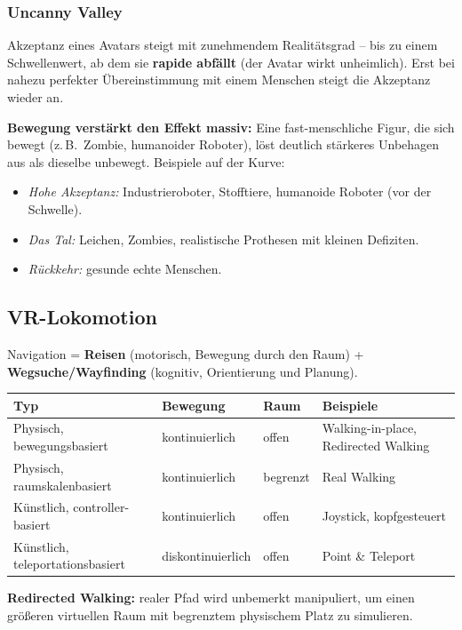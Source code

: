 \documentclass[12pt, a4paper]{article}
\begin{document}
\subsubsection*{Uncanny Valley}

Akzeptanz eines Avatars steigt mit zunehmendem Realitätsgrad -- bis zu einem Schwellenwert, ab dem sie \textbf{rapide abfällt} (der Avatar wirkt unheimlich). Erst bei nahezu perfekter Übereinstimmung mit einem Menschen steigt die Akzeptanz wieder an.

\textbf{Bewegung verstärkt den Effekt massiv:} Eine fast-menschliche Figur, die sich bewegt (z.\,B.\ Zombie, humanoider Roboter), löst deutlich stärkeres Unbehagen aus als dieselbe unbewegt. Beispiele auf der Kurve:
\begin{itemize}
  \item \textit{Hohe Akzeptanz:} Industrieroboter, Stofftiere, humanoide Roboter (vor der Schwelle).
  \item \textit{Das Tal:} Leichen, Zombies, realistische Prothesen mit kleinen Defiziten.
  \item \textit{Rückkehr:} gesunde echte Menschen.
\end{itemize}

\subsection{VR-Lokomotion}

Navigation = \textbf{Reisen} (motorisch, Bewegung durch den Raum) + \textbf{Wegsuche/Wayfinding} (kognitiv, Orientierung und Planung).

\begin{center}
\begin{tabular}{llll}
  \textbf{Typ} & \textbf{Bewegung} & \textbf{Raum} & \textbf{Beispiele} \\
  \hline
  Physisch, bewegungsbasiert & kontinuierlich & offen & Walking-in-place, Redirected Walking \\
  Physisch, raumskalenbasiert & kontinuierlich & begrenzt & Real Walking \\
  Künstlich, controller-basiert & kontinuierlich & offen & Joystick, kopfgesteuert \\
  Künstlich, teleportationsbasiert & diskontinuierlich & offen & Point \& Teleport \\
\end{tabular}
\end{center}

\textbf{Redirected Walking:} realer Pfad wird unbemerkt manipuliert, um einen größeren virtuellen Raum mit begrenztem physischem Platz zu simulieren.
\end{document}
